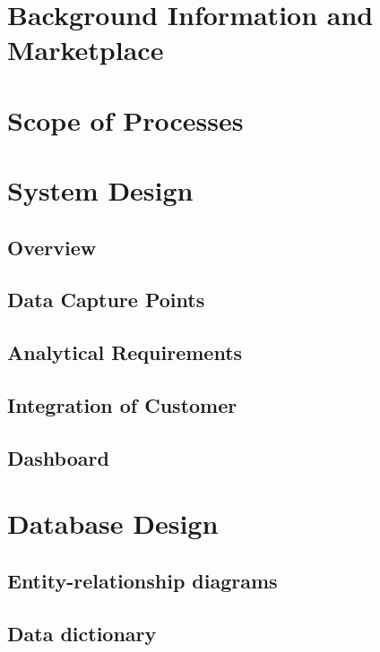 \documentclass[12pt,a4paper,oneside]{book}
\begin{document}


\mainmatter

\cleardoublepage
\chapter{Background Information and Marketplace}\label{chp:Introduction}
\chapter{Scope of Processes}
\chapter{System Design}
  \section{Overview}
  \section{Data Capture Points}
  \section{Analytical Requirements}
  \section{Integration of Customer}
  \section{Dashboard}
\chapter{Database Design}
  \section{Entity-relationship diagrams}
  \section{Data dictionary}
\end{document}
